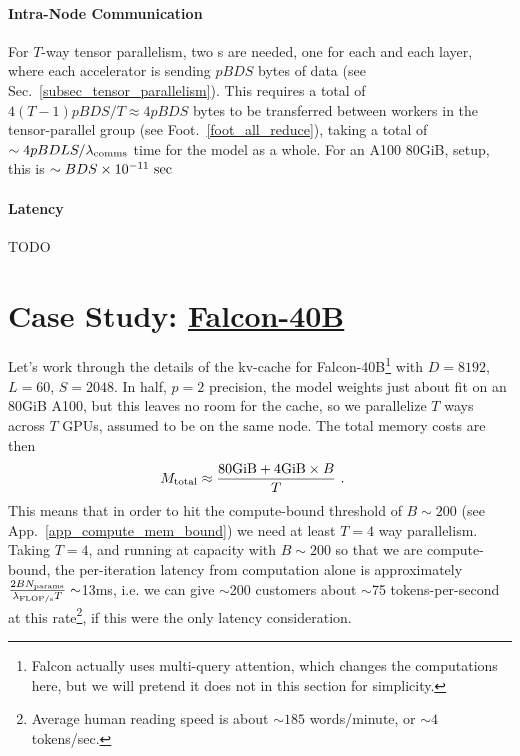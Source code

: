 \paragraph{Intra-Node Communication} For $ T $-way tensor parallelism, two s are
needed, one for each  and each  layer, where each
accelerator is sending $ pBDS  $ bytes of data (see Sec.~\ref{subsec_tensor_parallelism}). This
requires a total of $ 4\left ( T-1 \right ) pBDS/T \approx 4pBDS $ bytes to be transferred between
workers in the tensor-parallel group (see Foot.~\ref{foot_all_reduce}), taking a total of $ \sim  4pBDLS/
	\lambda _{ {\rm comms} }  $ time for the model as a whole. For an A100 80GiB,  setup, this is $ \sim
	BDS \times  10 ^{ -11 } \ {\rm sec} $


\paragraph{Latency} TODO



\section{Case Study: \href{https://huggingface.co/tiiuae/falcon-40b-instruct?_sm_vck=j230jZ2ssDkkPfJTfRt6tjQNTQZJ65N7VDWmj5Ff6f3jZ3mhh2Pq}{Falcon-40B}}

Let's work through the details of the kv-cache for Falcon-40B\footnote{Falcon actually uses
	multi-query attention, which changes the computations here, but we will pretend it does not in this
	section for simplicity.} with $ D=8192 $, $ L=60 $, $ S=2048 $.  In half, $ p=2 $ precision, the model weights just about fit on an
80GiB A100, but this leaves no room for the cache, so we parallelize $ T $ ways across $ T $ GPUs,
assumed to be on the same node. The total memory costs are then
\begin{align}
	M _{ {\rm  total} } & \approx  \frac{ {\rm 80GiB} + {\rm 4GiB}\times B }{ T } \ .
\end{align}
This means that in order to hit the compute-bound threshold of $ B \sim 200 $ (see
App.~\ref{app_compute_mem_bound}) we need at least $ T=4 $ way parallelism.  Taking $ T=4 $, and
running at capacity with $ B \sim 200$ so that we are compute-bound, the per-iteration latency from
computation alone is approximately $ \frac{2BN _{ {\rm params} } }{ \lambda _{ {\rm FLOP/s} } T} \sim
$13ms, i.e. we can give $ \sim $200 customers about $ \sim $75 tokens-per-second at this
rate\footnote{Average human reading speed is about $ \sim 185$ words/minute, or $ \sim 4
	$tokens/sec.}, if this were the only latency consideration.

